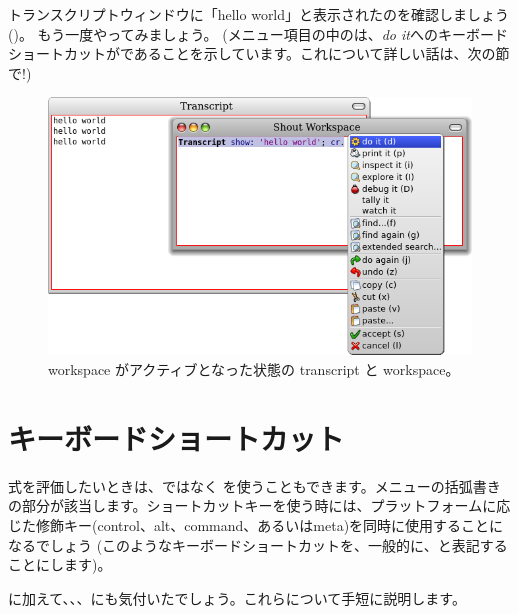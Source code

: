 \documentclass[a4paper,10pt,twoside]{book}
\begin{document}
トランスクリプトウィンドウに「hello world」と表示されたのを確認しましょう
()。
もう一度やってみましょう。
(メニュー項目の中のは、\emph{do it}へのキーボードショートカットがであることを示しています。これについて詳しい話は、次の節で!)

\begin{figure}[htb]
\centerline {\includegraphics[width=\textwidth]{HelloWorld}}
\caption{workspace がアクティブとなった状態の transcript と workspace。}
\end{figure}

\section{キーボードショートカット}

式を評価したいときは、\actclick ではなく を使うこともできます。メニューの括弧書きの部分が該当します。ショートカットキーを使う時には、プラットフォームに応じた修飾キー(control、alt、command、あるいはmeta)を同時に使用することになるでしょう
(このようなキーボードショートカットを、一般的に、と表記することにします)。


に加えて、、、にも気付いたでしょう。これらについて手短に説明します。

\end{document}
